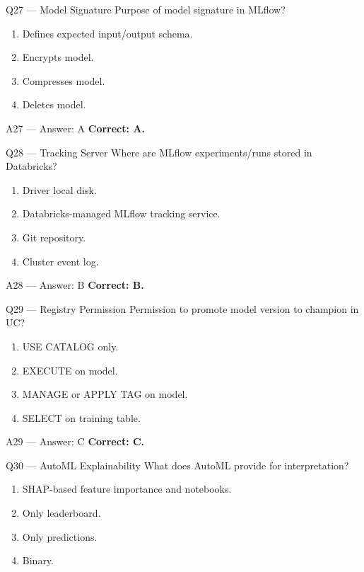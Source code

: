 \documentclass[aspectratio=169,9pt]{beamer}
\begin{document}
	\begin{frame}{Q27 — Model Signature}
		Purpose of model signature in MLflow?
		\begin{enumerate}[label=\Alph*.]
			\item Defines expected input/output schema.
			\item Encrypts model.
			\item Compresses model.
			\item Deletes model.
		\end{enumerate}
	\end{frame}
	
	\begin{frame}{A27 — Answer: A}
		\textbf{Correct: A.}
	\end{frame}
	
	\begin{frame}{Q28 — Tracking Server}
		Where are MLflow experiments/runs stored in Databricks?
		\begin{enumerate}[label=\Alph*.]
			\item Driver local disk.
			\item Databricks-managed MLflow tracking service.
			\item Git repository.
			\item Cluster event log.
		\end{enumerate}
	\end{frame}
	
	\begin{frame}{A28 — Answer: B}
		\textbf{Correct: B.}
	\end{frame}
	
	\begin{frame}{Q29 — Registry Permission}
		Permission to promote model version to champion in UC?
		\begin{enumerate}[label=\Alph*.]
			\item USE CATALOG only.
			\item EXECUTE on model.
			\item MANAGE or APPLY TAG on model.
			\item SELECT on training table.
		\end{enumerate}
	\end{frame}
	
	\begin{frame}{A29 — Answer: C}
		\textbf{Correct: C.}
	\end{frame}
	
	\begin{frame}{Q30 — AutoML Explainability}
		What does AutoML provide for interpretation?
		\begin{enumerate}[label=\Alph*.]
			\item SHAP-based feature importance and notebooks.
			\item Only leaderboard.
			\item Only predictions.
			\item Binary.
		\end{enumerate}
	\end{frame}
	
\end{document}
